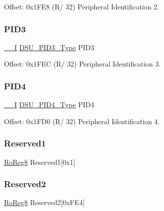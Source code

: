 Offset\+: 0x1\+F\+E8 (R/ 32) Peripheral Identification 2. 

\mbox{\label{struct_dsu_af67380c0b807adcea9d24ae09d1d54b6}} 
\subsubsection{\texorpdfstring{PID3}{PID3}}
{\footnotesize\ttfamily \mbox{\hyperlink{core__cm0plus_8h_af63697ed9952cc71e1225efe205f6cd3}{\+\_\+\+\_\+I}} \mbox{\hyperlink{union_d_s_u___p_i_d3___type}{D\+S\+U\+\_\+\+P\+I\+D3\+\_\+\+Type}} P\+I\+D3}



Offset\+: 0x1\+F\+EC (R/ 32) Peripheral Identification 3. 

\mbox{\label{struct_dsu_aad07c9f8931eb7916a9d7db486e7a1f9}} 
\subsubsection{\texorpdfstring{PID4}{PID4}}
{\footnotesize\ttfamily \mbox{\hyperlink{core__cm0plus_8h_af63697ed9952cc71e1225efe205f6cd3}{\+\_\+\+\_\+I}} \mbox{\hyperlink{union_d_s_u___p_i_d4___type}{D\+S\+U\+\_\+\+P\+I\+D4\+\_\+\+Type}} P\+I\+D4}



Offset\+: 0x1\+F\+D0 (R/ 32) Peripheral Identification 4. 

\mbox{\label{struct_dsu_a092866123ac46d0985136e4dca2f36f4}} 
\subsubsection{\texorpdfstring{Reserved1}{Reserved1}}
{\footnotesize\ttfamily \mbox{\hyperlink{group___s_a_m_d21_e15_a__definitions_ga0d957f1433aaf5d70e4dc2b68288442d}{Ro\+Reg8}} Reserved1\mbox{[}0x1\mbox{]}}

\mbox{\label{struct_dsu_ae2c627271321519d2066182e6b83317b}} 
\subsubsection{\texorpdfstring{Reserved2}{Reserved2}}
{\footnotesize\ttfamily \mbox{\hyperlink{group___s_a_m_d21_e15_a__definitions_ga0d957f1433aaf5d70e4dc2b68288442d}{Ro\+Reg8}} Reserved2\mbox{[}0x\+F\+E4\mbox{]}}

